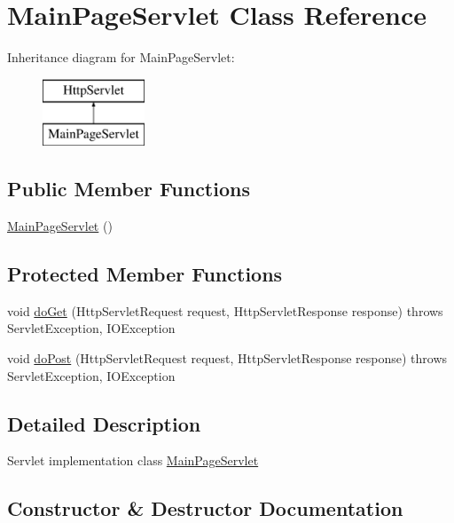 \hypertarget{class_main_page_servlet}{}\section{Main\+Page\+Servlet Class Reference}
\label{class_main_page_servlet}
Inheritance diagram for Main\+Page\+Servlet\+:\begin{figure}[H]
\begin{center}
\leavevmode
\includegraphics[height=2.000000cm]{class_main_page_servlet}
\end{center}
\end{figure}
\subsection*{Public Member Functions}
\begin{DoxyCompactItemize}
\item 
\hyperlink{class_main_page_servlet_a0b23130b80534dc206b4a288b1e53020}{Main\+Page\+Servlet} ()
\end{DoxyCompactItemize}
\subsection*{Protected Member Functions}
\begin{DoxyCompactItemize}
\item 
void \hyperlink{class_main_page_servlet_aa6d8401b0765748b6b8d02e3b83927b2}{do\+Get} (Http\+Servlet\+Request request, Http\+Servlet\+Response response)  throws Servlet\+Exception, I\+O\+Exception 
\item 
void \hyperlink{class_main_page_servlet_ac9c39a575df8e9a72cd77fa1e6f04479}{do\+Post} (Http\+Servlet\+Request request, Http\+Servlet\+Response response)  throws Servlet\+Exception, I\+O\+Exception 
\end{DoxyCompactItemize}


\subsection{Detailed Description}
Servlet implementation class \hyperlink{class_main_page_servlet}{Main\+Page\+Servlet} 

\subsection{Constructor \& Destructor Documentation}
\hypertarget{class_main_page_servlet_a0b23130b80534dc206b4a288b1e53020}{}
